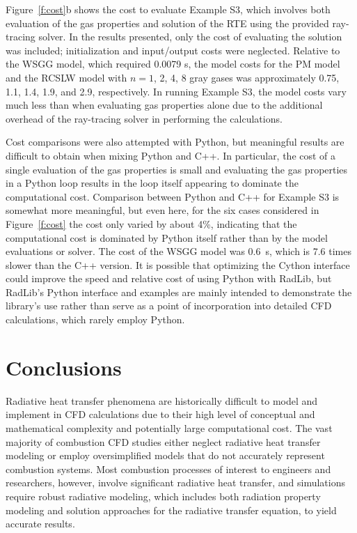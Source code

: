 \documentclass[preprint,12pt]{elsarticle}
\begin{document}
Figure~\ref{f:cost}b shows the cost to evaluate Example S3, which involves both evaluation of the gas properties and solution of the RTE using the provided ray-tracing solver. In the results presented, only the cost of evaluating the solution was included; initialization and input/output costs were neglected.
Relative to the WSGG model, which required 0.0079 s, the model costs for the PM model and the RCSLW model with $n=1$, 2, 4, 8 gray gases was approximately 0.75, 1.1, 1.4, 1.9, and 2.9, respectively. In running Example S3, the model costs vary much less than when evaluating gas properties alone due to the additional overhead of the ray-tracing solver in performing the calculations. 

Cost comparisons were also attempted with Python, but  meaningful results are difficult to obtain when mixing Python and C++. In particular, the cost of a single evaluation of the gas properties is small and evaluating the gas properties in a Python loop results in the loop itself appearing to dominate the computational cost. Comparison between Python and C++ for Example S3 is somewhat more meaningful, but even here, for the six cases considered in Figure~\ref{f:cost} the cost only varied by about 4\%, indicating that the computational cost is dominated by Python itself rather than by the model evaluations or solver. The cost of the WSGG model was 0.6~s, which is 7.6 times slower than the C++ version. It is possible that optimizing the Cython interface could improve the speed and relative cost of using Python with RadLib, but RadLib's Python interface and examples are mainly intended to demonstrate the library's use rather than serve as a point of incorporation into detailed CFD calculations, which rarely employ Python.


\section{Conclusions} \label{s:conclusions}

Radiative heat transfer phenomena are historically difficult to model and implement in CFD calculations due to their high level of conceptual and mathematical complexity and potentially large computational cost. The vast majority of combustion CFD studies either neglect radiative heat transfer modeling or employ oversimplified models that do not accurately represent combustion systems. Most combustion processes of interest to engineers and researchers, however, involve significant radiative heat transfer, and simulations require robust radiative modeling, which includes both radiation property modeling and solution approaches for the radiative transfer equation, to yield accurate results. 
\end{document}

